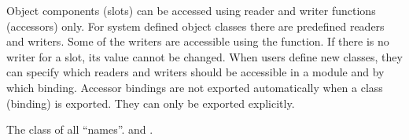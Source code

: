 %
\begin{optDefinition}
Object components (slots) can be accessed using reader and writer functions
(accessors) only. For system defined object classes there are predefined readers
and writers. Some of the writers are accessible using the 
function. If there is no writer for a slot, its value cannot be changed. When
users define new classes, they can specify which readers and writers should be
accessible in a module and by which binding.  Accessor bindings are not exported
automatically when a class (binding) is exported. They can only be exported
explicitly.

%
%
The class of all ``names''.
%
\seealso%
 and .
%
\end{optDefinition}
